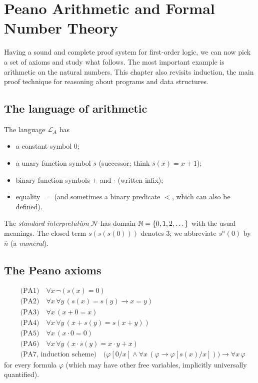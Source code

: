 \chapter{Peano Arithmetic and Formal Number Theory}\label{ch:peano}

Having a sound and complete proof system for first-order logic, we can now pick a set of
axioms and study what follows. The most important example is arithmetic on the natural
numbers. This chapter also revisits induction, the main proof technique for reasoning
about programs and data structures.

\section{The language of arithmetic}

The language $\mathcal{L}_A$ has
\begin{itemize}
  \item a constant symbol $0$;
  \item a unary function symbol $s$ (successor; think $s(x)=x+1$);
  \item binary function symbols $+$ and $\cdot$ (written infix);
  \item equality $=$ (and sometimes a binary predicate $<$, which can also be defined).
\end{itemize}
The \emph{standard interpretation} $\mathcal{N}$ has domain $\mathbb{N}=\{0,1,2,\dots\}$ with the
usual meanings. The closed term $s(s(s(0)))$ denotes $3$; we abbreviate $s^n(0)$ by
$\overline{n}$ (a \emph{numeral}).

\section{The Peano axioms}

\begin{definition}
\begin{align*}
&\text{(PA1)}\quad \forall x\,\neg(s(x)=0)\\
&\text{(PA2)}\quad \forall x\,\forall y\,(s(x)=s(y)\to x=y)\\
&\text{(PA3)}\quad \forall x\,(x+0=x)\\
&\text{(PA4)}\quad \forall x\,\forall y\,(x+s(y)=s(x+y))\\
&\text{(PA5)}\quad \forall x\,(x\cdot 0=0)\\
&\text{(PA6)}\quad \forall x\,\forall y\,(x\cdot s(y)=x\cdot y+x)\\
&\text{(PA7, induction scheme)}\quad
  \big(\varphi[0/x]\land\forall x\,(\varphi\to\varphi[s(x)/x])\big)\to\forall x\,\varphi
\end{align*}
for every formula $\varphi$ (which may have other free variables, implicitly universally
quantified).
\end{definition}

